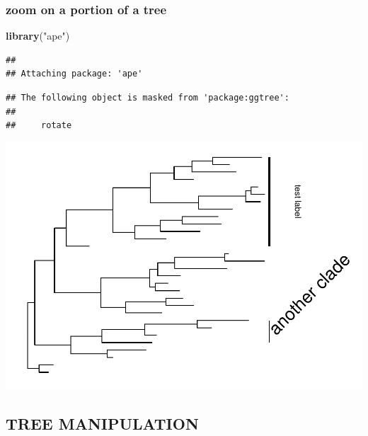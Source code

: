 \documentclass[]{article}
\newenvironment{Shaded}{\begin{snugshade}}{\end{snugshade}}
\newcommand{\KeywordTok}[1]{\textcolor[rgb]{0.13,0.29,0.53}{\textbf{#1}}}
\newcommand{\StringTok}[1]{\textcolor[rgb]{0.31,0.60,0.02}{#1}}
\newcommand{\OperatorTok}[1]{\textcolor[rgb]{0.81,0.36,0.00}{\textbf{#1}}}
\newcommand{\NormalTok}[1]{#1}
\begin{document}
\subsubsection{zoom on a portion of a
tree}\label{zoom-on-a-portion-of-a-tree}

\begin{Shaded}
\begin{Highlighting}[]
\KeywordTok{library}\NormalTok{(}\StringTok{"ape"}\NormalTok{)}
\end{Highlighting}
\end{Shaded}

\begin{verbatim}
## 
## Attaching package: 'ape'
\end{verbatim}

\begin{verbatim}
## The following object is masked from 'package:ggtree':
## 
##     rotate
\end{verbatim}

\begin{Shaded}
\end{Shaded}

\includegraphics{ggtree_files/figure-latex/unnamed-chunk-11-1.pdf}

\subsection{TREE MANIPULATION}\label{tree-manipulation}
\end{document}
